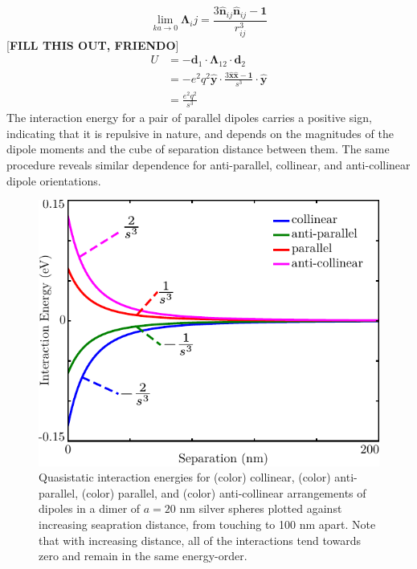 \documentclass [11pt, proquest] {uwthesis}[2016/11/22]
\begin{document}
\begin{equation}
\lim_{ka \to 0}\boldsymbol{\Lambda}_ij =  \frac{3\hat{\textbf{n}}_{ij}\hat{\textbf{n}}_{ij} - \textbf{1}}{r_{ij}^3}
\end{equation}
[\textbf{FILL THIS OUT, FRIENDO}]
\begin{equation}
\begin{split}
U &= -\textbf{d}_1\cdot\boldsymbol{\Lambda}_{12}\cdot\textbf{d}_2\\
&= -e^2q^2\hat{\textbf{y}}\cdot\frac{3\hat{\textbf{x}}\hat{\textbf{x}} - \textbf{1}}{s^3}\cdot\hat{\textbf{y}}\\
&= \frac{e^2q^2}{s^3}
\label{quasi_int}
\end{split}
\end{equation}
The interaction energy for a pair of parallel dipoles carries a positive sign, indicating that it is repulsive in nature, and depends on the magnitudes of the dipole moments and the cube of separation distance between them. The same procedure reveals similar dependence for anti-parallel, collinear, and anti-collinear dipole orientations.

\begin{figure}
\begin{centering}
\includegraphics{dimer_stat.pdf}
\caption{Quasistatic interaction energies for (color) collinear, (color) anti-parallel, (color) parallel, and (color) anti-collinear arrangements of dipoles in a dimer of $a=20$ nm silver spheres plotted against increasing seapration distance, from touching to 100 nm apart. Note that with increasing distance, all of the interactions tend towards zero and remain in the same energy-order.}
\label{dimer_stat}
\end{centering}
\end{figure}
\end{document}
